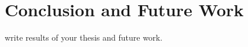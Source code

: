 \chapter{Conclusion and Future Work}
\label{ch:conclusion-future-work}

write results of your thesis and future work.

